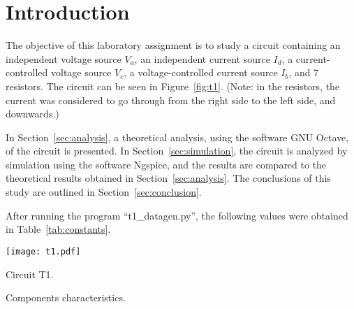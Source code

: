 \section{Introduction}
\label{sec:introduction}

The objective of this laboratory assignment is to study a circuit containing an
independent voltage source $V_a$, an independent current source $I_d$, a current-controlled voltage source $V_c$, a voltage-controlled current source $I_b$, and 7 resistors. The circuit can be seen in Figure~\ref{fig:t1}. (Note: in the resistors, the current was considered to go through from the right side to the left side, and downwards.)


In Section~\ref{sec:analysis}, a theoretical analysis, using the software GNU Octave, of the circuit is
presented. In Section~\ref{sec:simulation}, the circuit is analyzed by
simulation using the software Ngspice, and the results are compared to the theoretical results obtained in
Section~\ref{sec:analysis}. The conclusions of this study are outlined in
Section~\ref{sec:conclusion}.



After running the program ``t1\_datagen.py'', the following values were obtained in Table~\ref{tab:constants}.

\begin{minipage}[b]{0.48\textwidth}
\centering
    \texttt{[image: t1.pdf]}
    \captionsetup{type=figure}
\caption{Circuit T1.}
\label{fig:t1}
\end{minipage}
\begin{minipage}[b]{0.48\textwidth}
\centering
    
    \captionsetup{type=table}
  \caption{Components characteristics.}
  \label{tab:constants}
\end{minipage}

